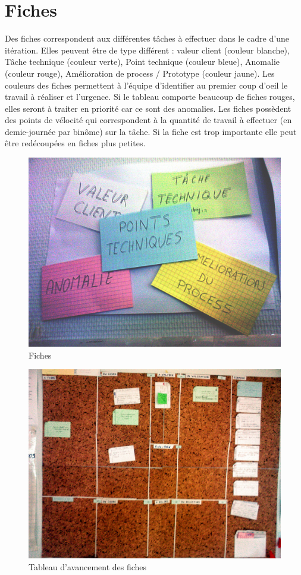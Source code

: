 \section{Fiches}\label{agile:fiches}
Des fiches correspondent aux différentes tâches à effectuer dans le cadre d'une itération. Elles peuvent être de type différent : valeur client (couleur blanche), Tâche technique (couleur verte), Point technique (couleur bleue), Anomalie (couleur rouge), Amélioration de process / Prototype (couleur jaune). Les couleurs des fiches permettent à l'équipe d'identifier au premier coup d'oeil le travail à réaliser et l'urgence. Si le tableau comporte beaucoup de fiches rouges, elles seront à traiter en priorité car ce sont des anomalies. Les fiches possèdent des points de vélocité qui correspondent à la quantité de travail à effectuer (en demie-journée par binôme) sur la tâche. Si la fiche est trop importante elle peut être redécoupées en fiches plus petites.
\begin{figure}[!ht]
\centering
\includegraphics[scale=0.10]{Illustrations/SP_A0185.jpg}
\caption{Fiches}
\label{fig:Fiches}
\end{figure}
\begin{figure}[!ht]
\centering
\includegraphics[scale=0.10]{Illustrations/SP_A0183.jpg}
\caption{Tableau d'avancement des fiches}
\label{fig:Tableau d'avancement des fiches}
\end{figure}

